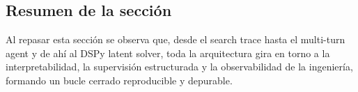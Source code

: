 \subsection{Resumen de la sección}
Al repasar esta sección se observa que, desde el search trace hasta el multi-turn agent y de ahí al DSPy latent solver, toda la arquitectura gira en torno a la interpretabilidad, la supervisión estructurada y la observabilidad de la ingeniería, formando un bucle cerrado reproducible y depurable.

